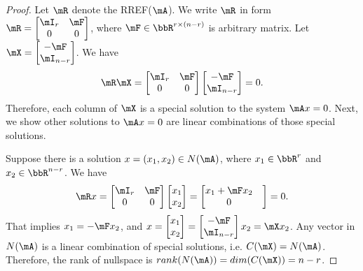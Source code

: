\documentclass[11pt]{article}
\theoremstyle{plain}
\theoremstyle{definition}
\begin{document}
\begin{proof} Let $\mR$ denote the RREF($\mA$).  We write $\mR$  in form $\mR = \begin{bmatrix} \mI_r & \mF \\ 0 & 0	\end{bmatrix}$, where $\mF \in \bbR^{ r \times (n-r)}$ is arbitrary matrix.
Let $\mX = \begin{bmatrix} -\mF \\ \mI_{n-r}	\end{bmatrix}$.  We have 
\begin{align}
	\mR \mX = \begin{bmatrix} \mI_r & \mF \\ 0 & 0	\end{bmatrix} \begin{bmatrix} -\mF \\ \mI_{n-r}	\end{bmatrix} = 0.
\end{align}
Therefore, each column of $\mX$ is a special solution to the system $\mA x = 0$. Next, we show other solutions to $\mA x = 0$ are linear combinations of those special solutions.

Suppose there is a solution $x = (x_1, x_2) \in N(\mA)$, where $x_1 \in \bbR^{r}$ and $x_2 \in \bbR^{n-r}$. We have 
\begin{align}
	\mR x = \begin{bmatrix} \mI_r & \mF \\ 0 & 0	\end{bmatrix} \begin{bmatrix} x_1 \\ x_2	\end{bmatrix} = \begin{bmatrix} x_1 + \mF x_2 \\  0 &\end{bmatrix} = 0.
\end{align}
That implies $x_1  = -\mF x_2$, and $x = \begin{bmatrix} x_1 \\ x_2	\end{bmatrix} = \begin{bmatrix} -\mF \\ \mI_{n-r}	\end{bmatrix} x_2 = \mX x_2$. Any vector  in $ N(\mA)$ is a linear combination of special solutions, i.e. $C(\mX) = N(\mA)$. Therefore, the rank of nullspace is $rank(N(\mA)) = dim(C(\mX)) = n-r$.
\end{proof}
\end{document}
